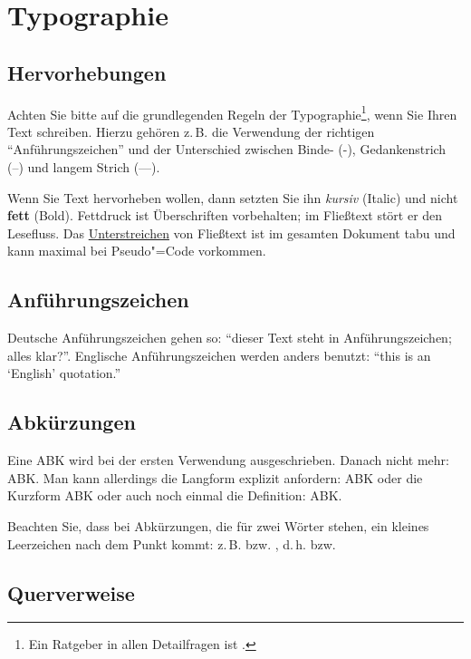 \chapter{Typographie}

\section{Hervorhebungen}
\label{Einleitung:Textauszeichnungen}

Achten Sie bitte auf die grundlegenden Regeln der Typographie\footnote{Ein Ratgeber in allen Detailfragen ist \cite{Forssman2002}.}, wenn Sie Ihren Text schreiben. Hierzu gehören z.\,B. die Verwendung der richtigen "`Anführungszeichen"' und der Unterschied zwischen Binde- (-), Gedankenstrich (--) und langem Strich (---).

Wenn Sie Text hervorheben wollen, dann setzten Sie ihn \textit{kursiv} (Italic) und nicht \textbf{fett} (Bold). Fettdruck ist Überschriften vorbehalten; im Fließtext stört er den Lesefluss. Das \underline{Unterstreichen} von Fließtext ist im gesamten Dokument tabu und kann maximal bei Pseudo"=Code vorkommen.


\section{Anführungszeichen}

Deutsche Anführungszeichen gehen so: "`dieser Text steht in \glq Anführungszeichen\grq; alles klar?"'. Englische Anführungszeichen werden anders benutzt: ``this is an `English' quotation.''

\section{Abkürzungen}

Eine \ac{ABK} wird bei der ersten Verwendung ausgeschrieben. Danach nicht mehr: \ac{ABK}. Man kann allerdings die Langform explizit anfordern: \acl{ABK} oder die Kurzform \acs{ABK} oder auch noch einmal die Definition: \acf{ABK}.

Beachten Sie, dass bei Abkürzungen, die für zwei Wörter stehen, ein kleines Leerzeichen nach dem Punkt kommt: z.\,B. bzw. \zb, d.\,h. bzw. \dahe


\section{Querverweise}

